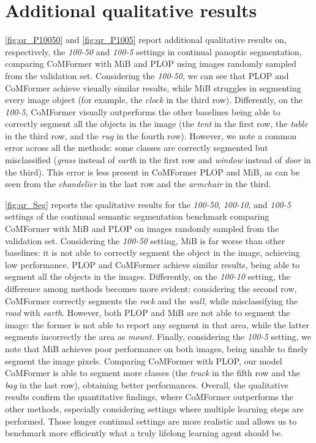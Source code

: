 \documentclass[10pt,twocolumn,letterpaper]{article}
\begin{document}
\section{Additional qualitative results}
\cref{fig:qr_P10050} and \cref{fig:qr_P1005} report additional qualitative results on, respectively, the \textit{100-50} and \textit{100-5} settings in continual panoptic segmentation, comparing CoMFormer with MiB and PLOP using images randomly sampled from the validation set. Considering the \textit{100-50}, we can see that PLOP and CoMFormer achieve visually similar results, while MiB struggles in segmenting every image object (for example, the \textit{clock} in the third row). 
Differently, on the \textit{100-5}, CoMFormer visually outperforms the other baselines being able to correctly segment all the objects in the image (\eg the \textit{tent} in the first row, the \textit{table} in the third row, and the \textit{rug} in the fourth row). However, we note a common error across all the methods: some classes are correctly segmented but misclassified (\eg \textit{grass} instead of \textit{earth} in the first row and \textit{window} instead of \textit{door} in the third). This error is less present in CoMFormer \wrt PLOP and MiB, as can be seen from the \textit{chandelier} in the last row and the \textit{armchair} in the third.

\cref{fig:qr_Seg} reports the qualitative results for the \textit{100-50}, \textit{100-10}, and \textit{100-5} settings of the continual semantic segmentation benchmark comparing CoMFormer with MiB and PLOP on images randomly sampled from the validation set. 
Considering the \textit{100-50} setting, MiB is far worse than other baselines: it is not able to correctly segment the object in the image, achieving low performance. PLOP and CoMFormer achieve similar results, being able to segment all the objects in the images. 
Differently, on the \textit{100-10} setting, the difference among methods becomes more evident: considering the second row, CoMFormer correctly segments the \textit{rock} and the \textit{wall}, while misclassifying the \textit{road} with \textit{earth}. However, both PLOP and MiB are not able to segment the image: the former is not able to report any segment in that area, while the latter segments incorrectly the area as \textit{mount}.
Finally, considering the \textit{100-5} setting, we note that MiB achieves poor performance on both images, being unable to finely segment the image pixels. Comparing CoMFormer with PLOP, our model CoMFormer is able to segment more classes (\eg the \textit{truck} in the fifth row and the \textit{bag} in the last row), obtaining better performances.
Overall, the qualitative results confirm the quantitative findings, where CoMFormer outperforms the other methods, especially considering settings where multiple learning steps are performed. Those longer continual settings are more realistic and allows us to benchmark more efficiently what a truly lifelong learning agent should be.
\end{document}
